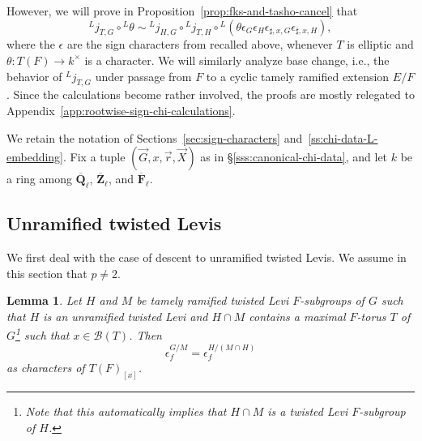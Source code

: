 \documentclass[reqno]{amsart}
\numberwithin{equation}{subsection}
\newcommand{\F}{\mathbf{F}}
\newcommand{\Q}{\mathbf{Q}}
\newcommand{\Z}{\mathbf{Z}}
\newcommand{\sgn}{\operatorname{sgn}}
\newcommand{\ol}[1]{\overline{#1}}
\newcommand{\co}{\colon}
\newcommand{\ld}{{}^L}
\newcommand\cB{\mathcal{B}}
\newcommand\frp{\mathfrak{p}}
\newtheorem{lemma}[thm]{Lemma}
\theoremstyle{remark}
\numberwithin{equation}{subsection}
\numberwithin{figure}{subsection}
\begin{document}
However, we will prove in Proposition~\ref{prop:fks-and-tasho-cancel} that
\[
\ld j_{T,G}\circ\ld\theta
\sim
\ld j_{H,G}\circ\ld j_{T,H}\circ
\ld(\theta\epsilon_G\epsilon_H\epsilon_{\sharp,x,G}\epsilon_{\sharp,x,H}),
\]
where the $\epsilon$ are the sign characters from \cite{FKS23} recalled above, whenever $T$ is elliptic and $\theta\co T(F) \to k^\times$ is a character. We will similarly analyze base change, i.e., the behavior of $\ld j_{T,G}$ under passage from $F$ to a cyclic tamely ramified extension $E/F$. Since the calculations become rather involved, the proofs are mostly relegated to Appendix~\ref{app:rootwise-sign-chi-calculations}.

We retain the notation of Sections~\ref{sec:sign-characters} and~\ref{ss:chi-data-L-embedding}. Fix a tuple $(\vec{G}, x, \vec{r}, \vec{X})$ as in \S\ref{sss:canonical-chi-data}, and let $k$ be a ring among $\ol\Q_\ell$, $\ol\Z_\ell$, and $\ol\F_\ell$.


\subsection{Unramified twisted Levis}\label{ss:unram-levi-signs}

We first deal with the case of descent to unramified twisted Levis. We assume in this section that $p \neq 2$.

\begin{lemma}\label{lemma:fks-unram-levi}
Let $H$ and $M$ be tamely ramified twisted Levi $F$-subgroups of $G$ such that $H$ is an unramified twisted Levi and $H \cap M$ contains a maximal $F$-torus $T$ of $G$\footnote{Note that this automatically implies that $H \cap M$ is a twisted Levi $F$-subgroup of $H$.} such that $x\in\cB(T)$. Then
\[
\epsilon_f^{G/M} = \epsilon_f^{H/(M\cap H)}
\]
as characters of $T(F)_{[x]}$.
\end{lemma}
\end{document}
